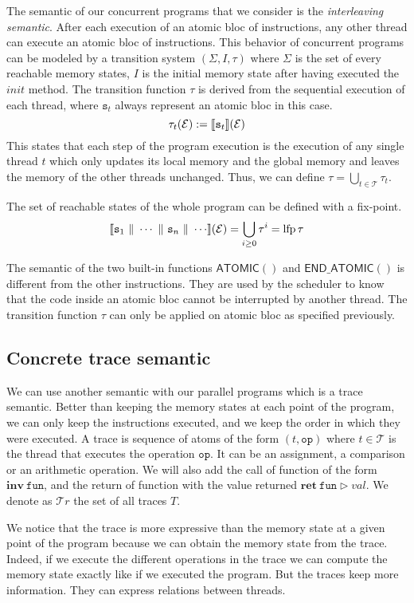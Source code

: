 \documentclass[runningheads]{llncs}
\newcommand\srule{\mathtt{s}}
\newcommand{\atomicbegin}{\mathsf{ATOMIC()}}
\newcommand{\atomicend}{\mathsf{END\_ATOMIC()}}
\newcommand{\inv}[1]{\mathbf{inv}\ \mathtt{#1}}
\newcommand{\ret}[2]{\mathbf{ret}\ \mathtt{#1} \vartriangleright #2}
\newcommand{\Thread}{\mathcal T}
\newcommand{\Traces}{\mathcal T\!r}
\newcommand{\parallelcomposition}{\Vert}
\DeclareMathOperator{\lfp}{lfp}
\begin{document}
The semantic of our concurrent programs that we consider is the \emph{interleaving semantic}. After each execution of an atomic bloc of instructions, any other thread can execute an atomic bloc of instructions. This behavior of concurrent programs can be modeled by a transition system $(\Sigma, I, \tau)$ where $\Sigma$ is the set of every reachable memory states, $I$ is the initial memory state after having executed the $init$ method. The transition function $\tau$ is derived from the sequential execution of each thread, where $\srule_t$ always represent an atomic bloc in this case. 
\[\tau_t (\mathcal E) := \exec{\srule_t}(\mathcal E)\]
This states that each step of the program execution is the execution of any single thread  $t$ which only updates its local memory and the global memory and leaves the memory of the other threads unchanged. Thus, we can define $\tau = \bigcup_{t\in\Thread} \tau_t$.

The set of reachable states of the whole program can be defined with a fix-point. 
\[\exec{\srule_1 \ \parallelcomposition \ \cdots \ \parallelcomposition \ \srule_n \ \parallelcomposition \ \cdots}(\mathcal E) = \bigcup_{i \geq 0} \tau^i = \lfp \tau\]


The semantic of the two built-in functions $\atomicbegin$ and $\atomicend$ is different from the other instructions. They are used by the scheduler to know that the code inside an atomic bloc cannot be interrupted by another thread. The transition function $\tau$ can only be applied on atomic bloc as specified previously. 


	\subsection{Concrete trace semantic}
	
We can use another semantic with our parallel programs which is a trace semantic. Better than keeping the memory states at each point of the program, we can only keep the instructions executed, and we keep the order in which they were executed. A trace is sequence of atoms of the form $(t, \mathtt{op})$ where $t \in \Thread$ is the thread that executes the operation $\mathtt{op}$. It can be an assignment, a comparison or an arithmetic operation. We will also add the call of function of the form $\inv{fun}$, and the return of function with the value returned $\ret{fun}{val}$.
We denote as $\Traces$ the set of all traces $T$. 

We notice that the trace is more expressive than the memory state at a given point of the program because we can obtain the memory state from the trace. Indeed, if we execute the different operations in the trace we can compute the memory state exactly like if we executed the program. But the traces keep more information. They can express relations between threads.
\end{document}
